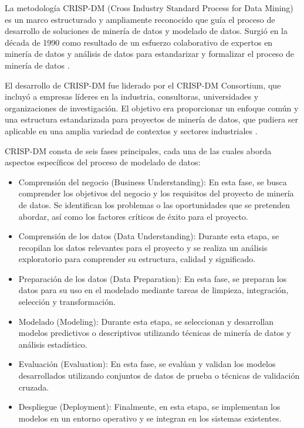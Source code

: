 \documentclass[
  11pt,
  bookmarksnumbered]{article}
\begin{document}
La metodología CRISP-DM (Cross Industry Standard Process for Data Mining) es un marco estructurado y ampliamente reconocido que guía el proceso de desarrollo de soluciones de minería de datos y modelado de datos.
Surgió en la década de 1990 como resultado de un esfuerzo colaborativo de expertos en minería de datos y análisis de datos para estandarizar y formalizar el proceso de minería de datos \textcite{Chapman2000}.

El desarrollo de CRISP-DM fue liderado por el CRISP-DM Consortium, que incluyó a empresas líderes en la industria, consultoras, universidades y organizaciones de investigación.
El objetivo era proporcionar un enfoque común y una estructura estandarizada para proyectos de minería de datos, que pudiera ser aplicable en una amplia variedad de contextos y sectores industriales \textcite{Shearer2000}.

CRISP-DM consta de seis fases principales, cada una de las cuales aborda aspectos específicos del proceso de modelado de datos:

\begin{itemize}
\item
  Comprensión del negocio (Business Understanding): En esta fase, se busca comprender los objetivos del negocio y los requisitos del proyecto de minería de datos.
  Se identifican los problemas o las oportunidades que se pretenden abordar, así como los factores críticos de éxito para el proyecto.
\item
  Comprensión de los datos (Data Understanding): Durante esta etapa, se recopilan los datos relevantes para el proyecto y se realiza un análisis exploratorio para comprender su estructura, calidad y significado.
\item
  Preparación de los datos (Data Preparation): En esta fase, se preparan los datos para su uso en el modelado mediante tareas de limpieza, integración, selección y transformación.
\item
  Modelado (Modeling): Durante esta etapa, se seleccionan y desarrollan modelos predictivos o descriptivos utilizando técnicas de minería de datos y análisis estadístico.
\item
  Evaluación (Evaluation): En esta fase, se evalúan y validan los modelos desarrollados utilizando conjuntos de datos de prueba o técnicas de validación cruzada.
\item
  Despliegue (Deployment): Finalmente, en esta etapa, se implementan los modelos en un entorno operativo y se integran en los sistemas existentes.
\end{itemize}
\end{document}

